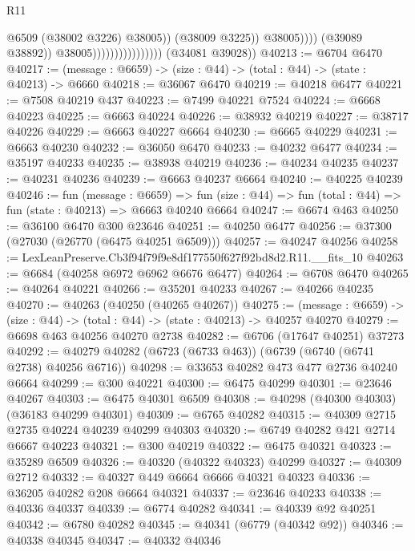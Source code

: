 \begin{lexlean}{R11}
\begin{coremodule}
                                                      @6509
                                                      (@38002 @3226)
                                                      @38005))
                                                  (@38009 @3225))
                                                @38005))))
                                        (@39089 @38892))
                                      @38005))))))))))))))))
      (@34081 @39028))
@40213 := @6704 @6470
@40217 := (message : @6659) -> (size : @44) -> (total : @44) -> (state : @40213) -> @6660
@40218 := @36067 @6470
@40219 := @40218 @6477
@40221 := @7508 @40219 @437
@40223 := @7499 @40221 @7524
@40224 := @6668 @40223
@40225 := @6663 @40224
@40226 := @38932 @40219
@40227 := @38717 @40226
@40229 := @6663 @40227 @6664
@40230 := @6665 @40229
@40231 := @6663 @40230
@40232 := @36050 @6470
@40233 := @40232 @6477
@40234 := @35197 @40233
@40235 := @38938 @40219
@40236 := @40234 @40235
@40237 := @40231 @40236
@40239 := @6663 @40237 @6664
@40240 := @40225 @40239
@40246 := fun (message : @6659) =>
  fun (size : @44) => fun (total : @44) => fun (state : @40213) => @6663 @40240 @6664
@40247 := @6674 @463
@40250 := @36100 @6470 @300 @23646
@40251 := @40250 @6477
@40256 := @37300 (@27030 (@26770 (@6475 @40251 @6509)))
@40257 := @40247 @40256
@40258 := LexLeanPreserve.Cb3f94f79f9e8df177550f627f92bd8d2.R11.__fits_10
@40263 := @6684 (@40258 @6972 @6962 @6676 @6477)
@40264 := @6708 @6470
@40265 := @40264 @40221
@40266 := @35201 @40233
@40267 := @40266 @40235
@40270 := @40263 (@40250 (@40265 @40267))
@40275 := (message : @6659) -> (size : @44) -> (total : @44) -> (state : @40213) -> @40257 @40270
@40279 := @6698 @463 @40256 @40270 @2738
@40282 := @6706 (@17647 @40251) @37273
@40292 := @40279 @40282 (@6723 (@6733 @463)) (@6739 (@6740 (@6741 @2738) @40256 @6716))
@40298 := @33653 @40282 @473 @477 @2736 @40240 @6664
@40299 := @300 @40221
@40300 := @6475 @40299
@40301 := @23646 @40267
@40303 := @6475 @40301 @6509
@40308 := @40298 (@40300 @40303) (@36183 @40299 @40301)
@40309 := @6765 @40282
@40315 := @40309 @2715 @2735 @40224 @40239 @40299 @40303
@40320 := @6749 @40282 @421 @2714 @6667 @40223
@40321 := @300 @40219
@40322 := @6475 @40321
@40323 := @35289 @6509
@40326 := @40320 (@40322 @40323) @40299
@40327 := @40309 @2712
@40332 := @40327 @449 @6664 @6666 @40321 @40323
@40336 := @36205 @40282 @208 @6664 @40321
@40337 := @23646 @40233
@40338 := @40336 @40337
@40339 := @6774 @40282
@40341 := @40339 @92 @40251
@40342 := @6780 @40282
@40345 := @40341 (@6779 (@40342 @92))
@40346 := @40338 @40345
@40347 := @40332 @40346

\end{coremodule}
\end{lexlean}
